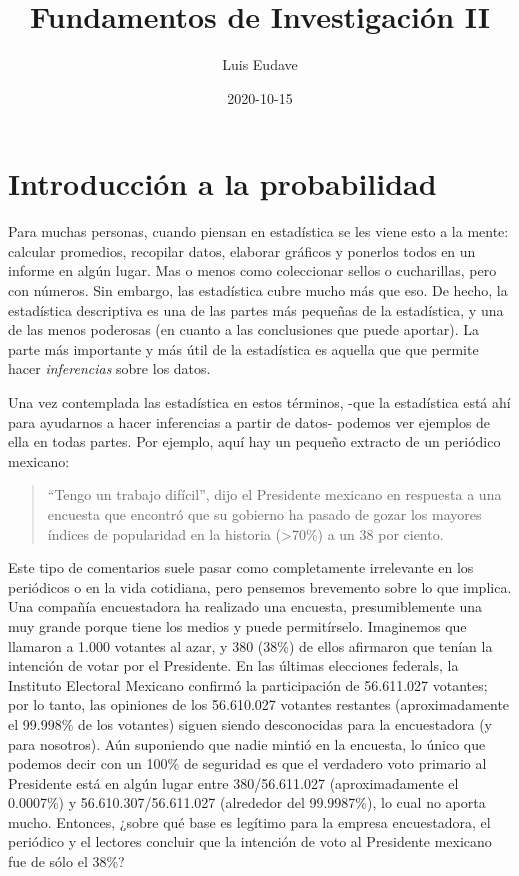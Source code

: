 \documentclass[spanish,]{book}
\title{Fundamentos de Investigación II}
\author{Luis Eudave}
\date{2020-10-15}
\begin{document}
\maketitle

{
\setcounter{tocdepth}{1}
\tableofcontents
}
\chapter{Introducción a la probabilidad}\label{probability}

Para muchas personas, cuando piensan en estadística se les viene esto a
la mente: calcular promedios, recopilar datos, elaborar gráficos y
ponerlos todos en un informe en algún lugar. Mas o menos como
coleccionar sellos o cucharillas, pero con números. Sin embargo, las
estadística cubre mucho más que eso. De hecho, la estadística
descriptiva es una de las partes más pequeñas de la estadística, y una
de las menos poderosas (en cuanto a las conclusiones que puede aportar).
La parte más importante y más útil de la estadística es aquella que que
permite hacer \emph{inferencias} sobre los datos.

Una vez contemplada las estadística en estos términos, -que la
estadística está ahí para ayudarnos a hacer inferencias a partir de
datos- podemos ver ejemplos de ella en todas partes. Por ejemplo, aquí
hay un pequeño extracto de un periódico mexicano:

\begin{quote}
``Tengo un trabajo difícil'', dijo el Presidente mexicano en respuesta a
una encuesta que encontró que su gobierno ha pasado de gozar los mayores
índices de popularidad en la historia (\textgreater{}70\%) a un 38 por
ciento.
\end{quote}

Este tipo de comentarios suele pasar como completamente irrelevante en
los periódicos o en la vida cotidiana, pero pensemos brevemento sobre lo
que implica. Una compañía encuestadora ha realizado una encuesta,
presumiblemente una muy grande porque tiene los medios y puede
permitírselo. Imaginemos que llamaron a 1.000 votantes al azar, y 380
(38\%) de ellos afirmaron que tenían la intención de votar por el
Presidente. En las últimas elecciones federals, la Instituto Electoral
Mexicano confirmó la participación de 56.611.027 votantes; por lo tanto,
las opiniones de los 56.610.027 votantes restantes (aproximadamente el
99.998\% de los votantes) siguen siendo desconocidas para la
encuestadora (y para nosotros). Aún suponiendo que nadie mintió en la
encuesta, lo único que podemos decir con un 100\% de seguridad es que el
verdadero voto primario al Presidente está en algún lugar entre
380/56.611.027 (aproximadamente el 0.0007\%) y 56.610.307/56.611.027
(alrededor del 99.9987\%), lo cual no aporta mucho. Entonces, ¿sobre qué
base es legítimo para la empresa encuestadora, el periódico y el
lectores concluir que la intención de voto al Presidente mexicano fue de
sólo el 38\%?
\end{document}
